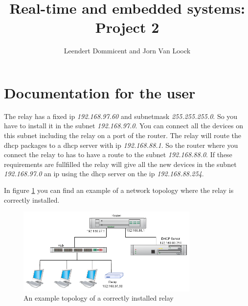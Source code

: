 \documentclass[a4]{article}
\title{Real-time and embedded systems: Project 2}
\author{Leendert Dommicent and Jorn Van Loock}
\begin{document}
\maketitle
\setlength{\parindent}{0px}
\setlength{\parskip}{8px}
\section{Documentation for the user}
\label{sec:user}
The relay has a fixed ip \textit{192.168.97.60} and subnetmask \textit{255.255.255.0}. So you have to install it in the subnet \textit{192.168.97.0}. You can connect all the devices on this subnet including the relay on a port of the router. The relay will route the dhcp packages to a dhcp server with ip \textit{192.168.88.1}. So the router where you connect the relay to has to have a route to the subnet \textit{192.168.88.0}. If these requirements are fullfilled the relay will give all the new devices in the subnet \textit{192.168.97.0} an ip using the dhcp server on the ip \textit{192.168.88.254}.\par
In figure \ref{fig:network} you can find an example of a network topology where the relay is correctly installed.
\begin{figure}[!ht]
\centering
\includegraphics[width = 0.8\textwidth]{Embeddednetwork.png}
\caption{An example topology of a correctly installed relay}
\label{fig:network}
\end{figure}
\end{document}
